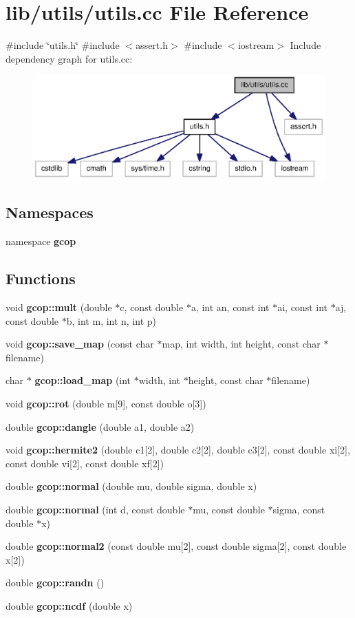 \section{lib/utils/utils.cc \-File \-Reference}
\label{utils_8cc}
{\ttfamily \#include \char`\"{}utils.\-h\char`\"{}}\*
{\ttfamily \#include $<$assert.\-h$>$}\*
{\ttfamily \#include $<$iostream$>$}\*
\-Include dependency graph for utils.\-cc\-:
\nopagebreak
\begin{figure}[H]
\begin{center}
\leavevmode
\includegraphics[width=350pt]{utils_8cc__incl}
\end{center}
\end{figure}
\subsection*{\-Namespaces}
\begin{DoxyCompactItemize}
\item 
namespace {\bf gcop}
\end{DoxyCompactItemize}
\subsection*{\-Functions}
\begin{DoxyCompactItemize}
\item 
void {\bf gcop\-::mult} (double $\ast$c, const double $\ast$a, int an, const int $\ast$ai, const int $\ast$aj, const double $\ast$b, int m, int n, int p)
\item 
void {\bf gcop\-::save\-\_\-map} (const char $\ast$map, int width, int height, const char $\ast$filename)
\item 
char $\ast$ {\bf gcop\-::load\-\_\-map} (int $\ast$width, int $\ast$height, const char $\ast$filename)
\item 
void {\bf gcop\-::rot} (double m[9], const double o[3])
\item 
double {\bf gcop\-::dangle} (double a1, double a2)
\item 
void {\bf gcop\-::hermite2} (double c1[2], double c2[2], double c3[2], const double xi[2], const double vi[2], const double xf[2])
\item 
double {\bf gcop\-::normal} (double mu, double sigma, double x)
\item 
double {\bf gcop\-::normal} (int d, const double $\ast$mu, const double $\ast$sigma, const double $\ast$x)
\item 
double {\bf gcop\-::normal2} (const double mu[2], const double sigma[2], const double x[2])
\item 
double {\bf gcop\-::randn} ()
\item 
double {\bf gcop\-::ncdf} (double x)
\end{DoxyCompactItemize}
